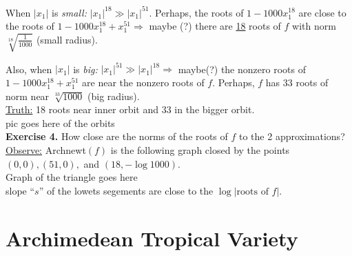 \documentclass[]{article}
\theoremstyle{definition}
\begin{document}
			When $|x_1|$ is \emph{small:} $|x_1|^{18} \gg|x_1|^{51}$. Perhaps, the roots of $1-1000x_1^{18}$ are close to the roots of $1-1000x_1^{18}+x_1^{51} \Rightarrow$ maybe (?) there are \underline{18} roots of $f$ with norm $\sqrt[18]{\frac{1}{1000}}$ (small radius).
			
			Also, when $|x_1|$ is \emph{big:} $|x_1|^{51}\gg|x_1|^{18} \Rightarrow$ maybe(?) the nonzero roots of $1-1000x_1^{18}+x_1^{51}$ are near the nonzero roots of $f$. Perhaps, $f$ has 33 roots of norm near $\sqrt[33]{1000}$ (big radius).
			\\
			
			\underline{Truth:} 18 roots near inner orbit and 33 in the bigger orbit.\\
			
			\vspace{.25in}
				pic goes here of the orbits			
			\vspace{.25in}\\
			
			\textbf{Exercise 4.} How close are the norms of the roots of $f$ to the 2 approximations?\\
			
			\underline{Observe:} Archnewt$(f)$ is the following graph closed by the points $(0,0),(51,0),$ and $(18,-\log1000)$.\\
			
			\vspace{.25in}
			Graph of the triangle goes here
			\vspace{.25in}\\
			slope ``$s$'' of the lowets segements are close to the $\log|\text{roots of $f$|}$.
			
			\section{Archimedean Tropical Variety}
\end{document}

